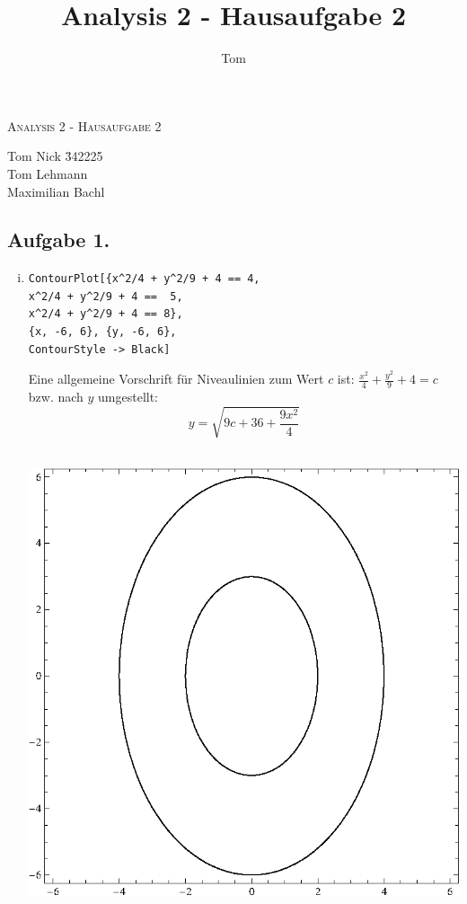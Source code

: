 \documentclass[10pt,a4paper]{scrartcl}
\author{Tom}
\title{Analysis 2 - Hausaufgabe 2}
\begin{document}
\begin{center}
\textsc{\Large{Analysis 2 - Hausaufgabe 2}} \\
\end{center}
\begin{tabbing}
Tom Nick \hspace{1.4cm}\= 342225\\
Tom Lehmann\\
Maximilian Bachl
\end{tabbing}
\subsection*{Aufgabe 1.}
\begin{enumerate}[(i)]
\item
\begin{minipage}{0.49\columnwidth}
\begin{lstlisting}[caption= Mathematica Code für die Niveaulinien von h]
ContourPlot[{x^2/4 + y^2/9 + 4 == 4, 
x^2/4 + y^2/9 + 4 ==  5, 
x^2/4 + y^2/9 + 4 == 8}, 
{x, -6, 6}, {y, -6, 6},
ContourStyle -> Black]
\end{lstlisting}
Eine allgemeine Vorschrift für Niveaulinien zum Wert $c$ ist: $\frac{x^2}{4} + \frac{y^2}{9} + 4 =c$ bzw. nach $y$ umgestellt: $$y = \sqrt{9c + 36 + \frac{9x^2}{4}}$$
\end{minipage}
\begin{minipage}{0.49\columnwidth}
$\qquad$\includegraphics[scale=0.7]{1i.eps} 

\end{minipage}
\end{enumerate}
\end{document}
